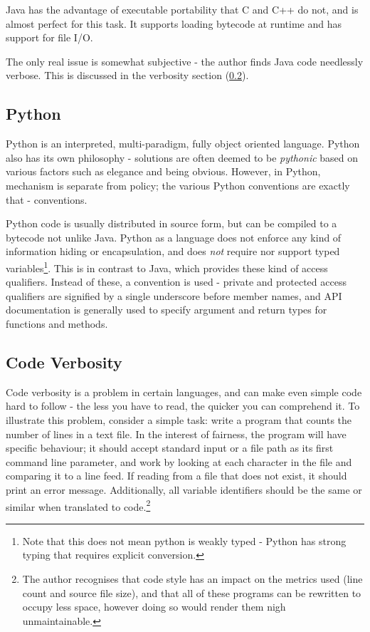 \documentclass[10pt,a4paper,notitlepage]{report}
\begin{document}
Java has the advantage of executable portability that C and C++ do not, and is almost perfect for this task. It supports loading bytecode at runtime and has support for file I/O.

The only real issue is somewhat subjective - the author finds Java code needlessly verbose. This is discussed in the verbosity section (\ref{sec:verbosity}).

\subsection{Python}
Python is an interpreted, multi-paradigm, fully object oriented language. Python also has its own philosophy - solutions are often deemed to be \emph{pythonic} based on various factors such as elegance and being obvious. However, in Python, mechanism is separate from policy; the various Python conventions are exactly that - conventions.

Python code is usually distributed in source form, but can be compiled to a bytecode not unlike Java. Python as a language does not enforce any kind of information hiding or encapsulation, and does \emph{not} require nor support typed variables\footnote{Note that this does not mean python is weakly typed -  Python has strong typing that requires explicit conversion.}. This is in contrast to Java, which provides these kind of access qualifiers. Instead of these, a convention is used - private and protected access qualifiers are signified by a single underscore before member names, and API documentation is generally used to specify argument and return types for functions and methods.

\subsection{Code Verbosity}
\label{sec:verbosity}
Code verbosity is a problem in certain languages, and can make even simple code hard to follow - the less you have to read, the quicker you can comprehend it.
\pagebreak
To illustrate this problem, consider a simple task: write a program that counts the number of lines in a text file.
In the interest of fairness, the program will have specific behaviour; it should accept standard input or a file path as its first command line parameter, and work by looking at each character in the file and comparing it to a line feed. If reading from a file that does not exist, it should print an error message. Additionally, all variable identifiers should be the same or similar when translated to code.\footnote{The author recognises that code style has an impact on the metrics used (line count and source file size), and that all of these programs can be rewritten to occupy less space, however doing so would render them nigh unmaintainable.}
\end{document}
